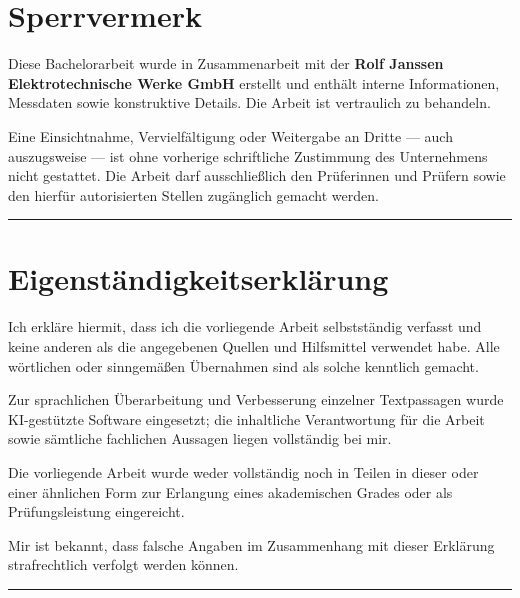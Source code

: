 
\section*{Sperrvermerk}

Diese Bachelorarbeit wurde in Zusammenarbeit mit der \textbf{Rolf Janssen Elektrotechnische Werke GmbH} erstellt und enthält interne Informationen, Messdaten sowie konstruktive Details. Die Arbeit ist vertraulich zu behandeln.

Eine Einsichtnahme, Vervielfältigung oder Weitergabe an Dritte --- auch auszugsweise --- ist ohne vorherige schriftliche Zustimmung des Unternehmens nicht gestattet. Die Arbeit darf ausschließlich den Prüferinnen und Prüfern sowie den hierfür autorisierten Stellen zugänglich gemacht werden.

\vspace{2.5cm}

\noindent{} \hspace{4cm} 
\hrule

\clearpage

\section*{Eigenständigkeitserklärung}

Ich erkläre hiermit, dass ich die vorliegende Arbeit selbstständig verfasst und keine anderen als die angegebenen Quellen und Hilfsmittel verwendet habe. Alle wörtlichen oder sinngemäßen Übernahmen sind als solche kenntlich gemacht.

Zur sprachlichen Überarbeitung und Verbesserung einzelner Textpassagen wurde KI-gestützte Software eingesetzt; die inhaltliche Verantwortung für die Arbeit sowie sämtliche fachlichen Aussagen liegen vollständig bei mir.

Die vorliegende Arbeit wurde weder vollständig noch in Teilen in dieser oder einer ähnlichen Form zur Erlangung eines akademischen Grades oder als Prüfungsleistung eingereicht.

Mir ist bekannt, dass falsche Angaben im Zusammenhang mit dieser Erklärung strafrechtlich verfolgt werden können.

\vspace{3cm}

\noindent{} \hspace{4cm} 
\hrule
